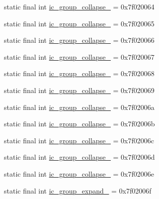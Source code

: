 \begin{CompactItemize}
\item 
static final int \hyperlink{classandroid_1_1support_1_1v7_1_1cardview_1_1_r_1_1drawable_4302b4569573d562c2c310891e316341}{ic\_\-group\_\-collapse\_} = 0x7f020064
\item 
static final int \hyperlink{classandroid_1_1support_1_1v7_1_1cardview_1_1_r_1_1drawable_fc774df9a08bc02a3765fb05183cbf3b}{ic\_\-group\_\-collapse\_} = 0x7f020065
\item 
static final int \hyperlink{classandroid_1_1support_1_1v7_1_1cardview_1_1_r_1_1drawable_2486bda8f456d63c6626ac7e17fb8dd6}{ic\_\-group\_\-collapse\_} = 0x7f020066
\item 
static final int \hyperlink{classandroid_1_1support_1_1v7_1_1cardview_1_1_r_1_1drawable_1f2bb1e5ec93cee4d4253e9f122ec291}{ic\_\-group\_\-collapse\_} = 0x7f020067
\item 
static final int \hyperlink{classandroid_1_1support_1_1v7_1_1cardview_1_1_r_1_1drawable_91d9ef3b8c0c6d98c437b1f9da437f92}{ic\_\-group\_\-collapse\_} = 0x7f020068
\item 
static final int \hyperlink{classandroid_1_1support_1_1v7_1_1cardview_1_1_r_1_1drawable_0ad04356e05322291a7f8999a5d4aac8}{ic\_\-group\_\-collapse\_} = 0x7f020069
\item 
static final int \hyperlink{classandroid_1_1support_1_1v7_1_1cardview_1_1_r_1_1drawable_26dab66fdaf325d827c5f778bf44080d}{ic\_\-group\_\-collapse\_} = 0x7f02006a
\item 
static final int \hyperlink{classandroid_1_1support_1_1v7_1_1cardview_1_1_r_1_1drawable_daf1c87a1ba8e27497f16fb65e9c944e}{ic\_\-group\_\-collapse\_} = 0x7f02006b
\item 
static final int \hyperlink{classandroid_1_1support_1_1v7_1_1cardview_1_1_r_1_1drawable_7d7dfc7982ae8dd20417d2caaba3b298}{ic\_\-group\_\-collapse\_} = 0x7f02006c
\item 
static final int \hyperlink{classandroid_1_1support_1_1v7_1_1cardview_1_1_r_1_1drawable_7f51b2dbcbac6c77bec436c4c50c3203}{ic\_\-group\_\-collapse\_} = 0x7f02006d
\item 
static final int \hyperlink{classandroid_1_1support_1_1v7_1_1cardview_1_1_r_1_1drawable_4ea6f3e21f98456dd11ef80c8f976111}{ic\_\-group\_\-collapse\_} = 0x7f02006e
\item 
static final int \hyperlink{classandroid_1_1support_1_1v7_1_1cardview_1_1_r_1_1drawable_19db125d884b15724a18a5e2531a3cbb}{ic\_\-group\_\-expand\_} = 0x7f02006f
\item 

\end{CompactItemize}
